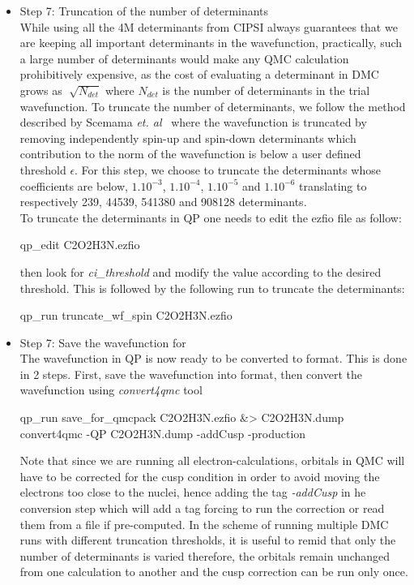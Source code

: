 \begin{itemize}
\item Step 7: Truncation of the number of determinants\\
While using all the 4M determinants from CIPSI always guarantees that we are keeping all important determinants in the wavefunction, practically, such a large number of determinants would make any QMC calculation prohibitively expensive, as the cost of evaluating a determinant in DMC grows as $\sqrt[]{N_{det}}$ where $N_{det}$ is the number of determinants in the trial wavefunction. To truncate the number of determinants, we follow the method described by Scemama \textit{et. al}~\cite{Scemama2018} where the wavefunction is truncated by removing independently spin-up and spin-down determinants which contribution to the norm of the wavefunction is below a user defined threshold $\epsilon$. For this step, we choose to truncate the determinants whose coefficients are below, $1.10^{-3}$, $1.10^{-4}$, $1.10^{-5}$ and $1.10^{-6}$ translating to respectively 239, 44539, 541380 and 908128 determinants.\\ 
To truncate the determinants in QP one needs to edit the ezfio file as follow:\\
\begin{shade}
qp_edit C2O2H3N.ezfio  
\end{shade}

then look for \textit{ci\_threshold} and modify the value according to the desired threshold. This is followed by the following run to truncate the determinants:\\

\begin{shade}
qp_run truncate_wf_spin C2O2H3N.ezfio  
\end{shade}

\item Step 7: Save the wavefunction for \qmcpack \\
The wavefunction in QP is now ready to be converted to \qmcpack format. This is done in 2 steps. 
First, save the wavefunction into \qmcpack format, then convert the wavefunction using \textit{convert4qmc} tool\\

\begin{shade}
qp_run save_for_qmcpack C2O2H3N.ezfio &> C2O2H3N.dump  
convert4qmc -QP C2O2H3N.dump -addCusp -production
\end{shade}

Note that since we are running all electron-calculations, orbitals in QMC will have to be corrected for the cusp condition in order to avoid moving the electrons too close to the nuclei, hence adding the tag \textit{-addCusp} in he conversion step which will add a tag forcing \qmcpack to run the correction or read them from a file if pre-computed. In the scheme of running multiple DMC runs  with different truncation thresholds, it is useful to remid that only the number of determinants is varied therefore, the orbitals remain unchanged from one calculation to another and the cusp correction can be run only once.


\end{itemize}
